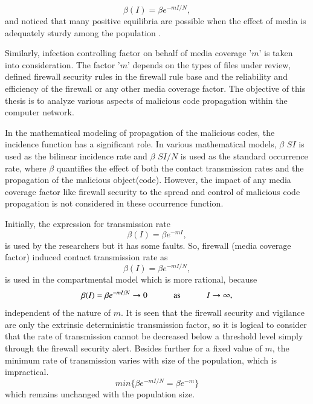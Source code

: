 \begin{equation} \beta (I) = \beta e^{-m I/N}, \end{equation} and noticed that many positive equilibria are possible when the effect of media is adequately
 sturdy among the population \cite{edtr10,edtr11,edtr12,edtr13}.
\par
Similarly, infection controlling factor on behalf of media coverage '$m$' is taken into consideration. The factor '$m$' depends on the types of files under review, defined firewall security rules in the firewall rule base and the reliability and efficiency of the
 firewall or any other media coverage factor. The objective of this thesis is to analyze various aspects of malicious code propagation within the computer network.

In the mathematical modeling of propagation of the malicious codes, the incidence function has a significant role. In various mathematical models, $\beta$ $SI$ is used as
 the bilinear incidence rate and $\beta$ $SI/N$ is used as the standard occurrence rate, where $\beta$ quantifies the effect of both the contact transmission rates
 and the propagation of the malicious object(code). However, the impact of any media coverage factor like firewall security to the spread and control of malicious code
 propagation is not considered in these occurrence function.
\par Initially, the expression for transmission rate \begin{equation*} \beta (I) = \beta e^{-m I}, \end{equation*} is used by the researchers but it has some faults.
So, firewall (media coverage factor) induced contact transmission rate as \begin{equation*} \beta (I) = \beta e^{-m I/N}, \end{equation*} is used in
the compartmental model which is more rational, because
\begin{equation*} \beta (I) = \beta e^{-m I/N}\rightarrow 0 \hspace{1 cm} \ \mbox{as} \ \hspace{1 cm} I \rightarrow \infty, \end{equation*}
independent of the nature of $m$. It is seen that the firewall security and vigilance are only the extrinsic deterministic transmission factor,
so it is logical to consider that the rate of transmission cannot be decreased below a threshold level simply through the firewall security alert.
 Besides further for a fixed value of $m$, the minimum rate of transmission varies with size of the population, which is impractical.
\begin{equation*}min\{\beta e^{-m I/N}= \beta e^{-m} \} \end{equation*}
 which remains unchanged with the population size\cite{edtr15,edtr19}.


